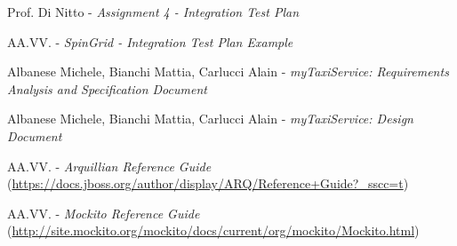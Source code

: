 \documentclass[a4paper, 12pt]{article}
\begin{document}
\appendix

\clearpage
{}

\begin{thebibliography}{9}
    Prof. Di Nitto - \emph{Assignment 4 - Integration Test Plan}

    AA.VV. - \emph{SpinGrid - Integration Test Plan Example}

        Albanese Michele, Bianchi Mattia, Carlucci Alain - \emph{myTaxiService: Requirements Analysis and Specification Document}

        Albanese Michele, Bianchi Mattia, Carlucci Alain - \emph{myTaxiService: Design Document}

        AA.VV. - \emph{Arquillian Reference Guide} {\small(\url{https://docs.jboss.org/author/display/ARQ/Reference+Guide?_sscc=t})}

        AA.VV. - \emph{Mockito Reference Guide} {\small(\url{http://site.mockito.org/mockito/docs/current/org/mockito/Mockito.html})}
\end{thebibliography}

\vfill

\end{document}
